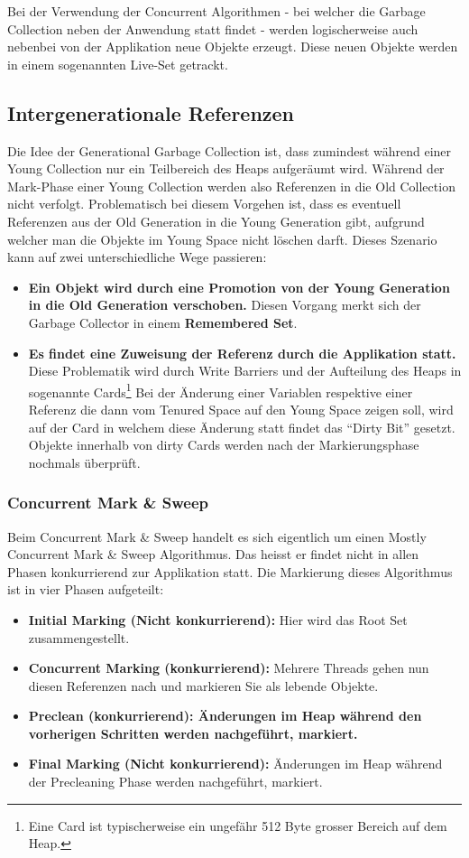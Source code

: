 Bei der Verwendung der Concurrent Algorithmen - bei welcher die Garbage Collection neben der Anwendung statt findet - werden logischerweise auch nebenbei von der Applikation neue Objekte erzeugt. Diese neuen Objekte werden in einem sogenannten Live-Set getrackt.

\subsection{Intergenerationale Referenzen}
Die Idee der Generational Garbage Collection ist, dass zumindest während einer Young Collection nur ein Teilbereich des Heaps aufgeräumt wird. Während der Mark-Phase einer Young Collection werden also Referenzen in die Old Collection nicht verfolgt. Problematisch bei diesem Vorgehen ist, dass es eventuell Referenzen aus der Old Generation in die Young Generation gibt, aufgrund welcher man die Objekte im Young Space nicht löschen darft. Dieses Szenario kann auf zwei unterschiedliche Wege passieren:
\begin{itemize}
	\item \textbf{Ein Objekt wird durch eine Promotion von der Young Generation in die Old Generation verschoben.} Diesen Vorgang merkt sich der Garbage Collector in einem \textbf{Remembered Set}. 
	\item \textbf{Es findet eine Zuweisung der Referenz durch die Applikation statt.} Diese Problematik wird durch Write Barriers und der Aufteilung des Heaps in sogenannte Cards\footnote{Eine Card ist typischerweise ein ungefähr 512 Byte grosser Bereich auf dem Heap.} Bei der Änderung einer Variablen respektive einer Referenz die dann vom Tenured Space auf den Young Space zeigen soll, wird auf der Card in welchem diese Änderung statt findet das ``Dirty Bit'' gesetzt. Objekte innerhalb von dirty Cards werden nach der Markierungsphase nochmals überprüft.
\end{itemize}

\subsubsection{Concurrent Mark \& Sweep}
Beim Concurrent Mark \& Sweep handelt es sich eigentlich um einen Mostly Concurrent Mark \& Sweep Algorithmus. Das heisst er findet nicht in allen Phasen konkurrierend zur Applikation statt. Die Markierung dieses Algorithmus ist in vier Phasen aufgeteilt:
\begin{itemize}
	\item \textbf{Initial Marking (Nicht konkurrierend):} Hier wird das Root Set zusammengestellt.
	\item \textbf{Concurrent Marking (konkurrierend):} Mehrere Threads gehen nun diesen Referenzen nach und markieren Sie als lebende Objekte.
	\item \textbf{Preclean (konkurrierend): Änderungen im Heap während den vorherigen Schritten werden nachgeführt, markiert.}
	\item \textbf{Final Marking (Nicht konkurrierend):} Änderungen im Heap während der Precleaning Phase werden nachgeführt, markiert.
\end{itemize}

